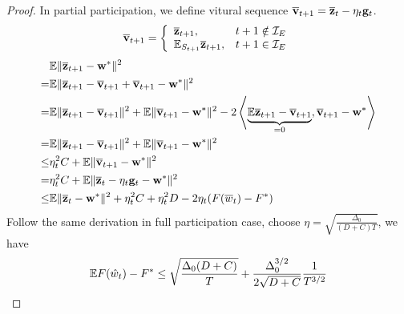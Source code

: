 \begin{proof}
In partial participation, we define vitural sequence $ {\overline{\mathbf{v}}}_{t+1} = {\overline{\mathbf{z}}}_{t} - \eta_t {\mathbf{g}}_t$.
\begin{align}
{\overline{\mathbf{v}}}_{t+1} =  \left\{\begin{array}{ll}
    {\overline{\mathbf{z}}}_{t+1},  & t + 1 \notin {\mathcal{I}}_{E}\\
	\mathbb{E}_{S_{t+1}} {\overline{\mathbf{z}}}_{t+1}, &  t + 1 \in {\mathcal{I}}_{E}
\end{array} \right.
\end{align}
\begin{align}
  & \mathbb{E}\|{\overline{\mathbf{z}}}_{t+1} - {\mathbf{w}}^* \|^2  \\
=&  \mathbb{E}\|{\overline{\mathbf{z}}}_{t+1} - {\overline{\mathbf{v}}}_{t+1} + {\overline{\mathbf{v}}}_{t+1} -  {\mathbf{w}}^* \|^2 	\\
=&  \mathbb{E}\|{\overline{\mathbf{z}}}_{t+1} - {\overline{\mathbf{v}}}_{t+1}\|^2  + \mathbb{E}\|{\overline{\mathbf{v}}}_{t+1} -  {\mathbf{w}}^* \|^2 - 2 \left<\underbrace{\mathbb{E} {\overline{\mathbf{z}}}_{t+1} - {\overline{\mathbf{v}}}_{t+1}}_{= 0}, {\overline{\mathbf{v}}}_{t+1} -  {\mathbf{w}}^*\right> 	 \\
=&  \mathbb{E}\|{\overline{\mathbf{z}}}_{t+1} - {\overline{\mathbf{v}}}_{t+1}\|^2  + \mathbb{E}\|{\overline{\mathbf{v}}}_{t+1} -  {\mathbf{w}}^* \|^2 \\
\leq& \eta_t^2 C	 + \mathbb{E}\|{\overline{\mathbf{v}}}_{t+1} -  {\mathbf{w}}^* \|^2 \\
 = & \eta_t^2 C	 + \mathbb{E}\|\overline{{\mathbf{z}}}_{t} - \eta_t{\mathbf{g}}_t - {\mathbf{w}}^* \|^2  \\
\leq& \mathbb{E}\|{\overline{\mathbf{z}}}_{t} - {\mathbf{w}}^* \|^2 +  \eta_t^2 C +  \eta_t^2 D   - 2\eta_t(F(\overline{w}_t) - F^*)
\end{align} 
Follow the same derivation in full participation case, choose $\eta = \sqrt{\frac{\Delta_0}{(D+C)T}}$, we have
\begin{align*}
	 \mathbb{E} F(\hat{w}_t) - F^* & \leq \sqrt{\frac{\Delta_0(D + C)}{T}} + \frac{\Delta_0^{3/2}}{2\sqrt{D+C}}\frac{1}{T^{3/2}} \nonumber\\
\end{align*}

\end{proof}


